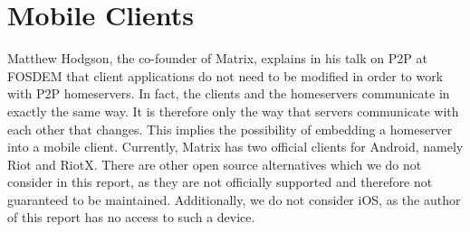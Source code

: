 
\section{Mobile Clients}\label{sec:official_clients}
Matthew Hodgson, the co-founder of Matrix, explains in his talk on \ac{P2P} at FOSDEM\cite{fosdem_event_p2p_matrix} that client applications do not need to be modified in order to work with \ac{P2P} homeservers.
In fact, the clients and the homeservers communicate in exactly the same way.
It is therefore only the way that servers communicate with each other that changes.
This implies the possibility of embedding a homeserver into a mobile client.
Currently, Matrix has two official clients for Android, namely Riot and RiotX.
There are other open source alternatives which we do not consider in this report, as they are not officially supported and therefore not guaranteed to be maintained.
Additionally, we do not consider iOS, as the author of this report has no access to such a device.

